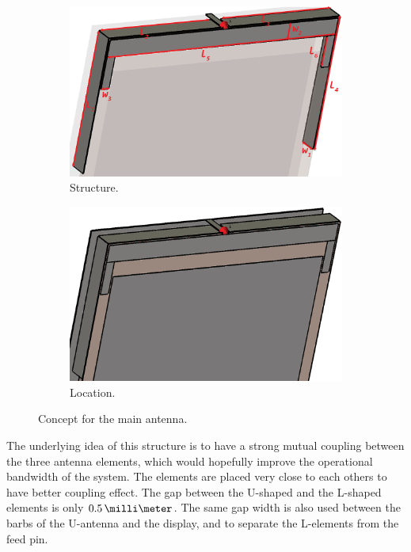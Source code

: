 \begin{figure}[H]
    \centering
    \begin{subfigure}[b]{0.49\textwidth}
        \includegraphics[width=\textwidth]{img/main_concept.eps}
        \caption{Structure.}
        \label{fig:main_concept}
    \end{subfigure}
    \begin{subfigure}[b]{0.49\textwidth}
        \includegraphics[width=\textwidth]{img/main_location.eps}
        \caption{Location.}
        \label{fig:main_location}
    \end{subfigure}
    \caption{Concept for the main antenna.}
    \label{fig:main_antenna1}
\end{figure}

The underlying idea of this structure is to have a strong mutual coupling between the three antenna elements, which would hopefully improve the operational bandwidth of the system. The elements are placed very close to each others to have better coupling effect. The gap between the U-shaped and the L-shaped elements is only $0.5\,\milli\meter$. The same gap width is also used between the barbs of the U-antenna and the display, and to separate the L-elements from the feed pin.


